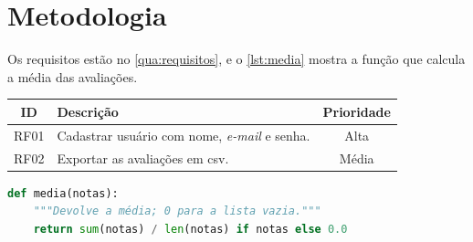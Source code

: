 \chapter{Metodologia}\label{cap:metodologia}

Os requisitos estão no \autoref{qua:requisitos}, e o \autoref{lst:media}
mostra a função que calcula a média das avaliações.

\begin{quadro}[htbp]
  \caption{Requisitos funcionais do protótipo}\label{qua:requisitos}
  \renewcommand{\arraystretch}{1.25}
  \begin{tabularx}{\textwidth}{|c|X|c|}
    \hline
    \textbf{ID} & \textbf{Descrição} & \textbf{Prioridade} \\
    \hline
    RF01 & Cadastrar usuário com nome, \emph{e-mail} e senha. & Alta \\
    \hline
    RF02 & Exportar as avaliações em \acs{csv}. & Média \\
    \hline
  \end{tabularx}
\end{quadro}

\begin{codigo}[htbp]
  \caption{Média das avaliações}\label{lst:media}
\begin{lstlisting}[language=Python]
def media(notas):
    """Devolve a média; 0 para a lista vazia."""
    return sum(notas) / len(notas) if notas else 0.0
\end{lstlisting}
\end{codigo}
